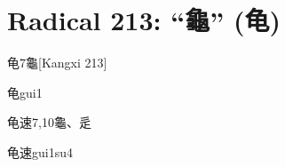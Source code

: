 
\section*{Radical 213: ``⿔'' (龟)}

\begin{Entry}{龟}{7}{⿔}[Kangxi 213]
  \begin{Phonetics}{龟}{gui1}
  \end{Phonetics}
\end{Entry}

\begin{Entry}{龟速}{7,10}{⿔、⾡}
  \begin{Phonetics}{龟速}{gui1su4}
  \end{Phonetics}
\end{Entry}


